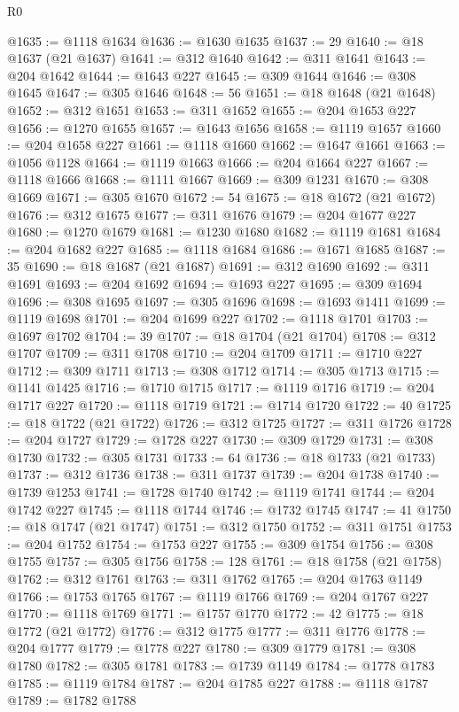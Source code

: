 \begin{lexlean}{R0}
\begin{coremodule}
@1635 := @1118 @1634
@1636 := @1630 @1635
@1637 := 29
@1640 := @18 @1637 (@21 @1637)
@1641 := @312 @1640
@1642 := @311 @1641
@1643 := @204 @1642
@1644 := @1643 @227
@1645 := @309 @1644
@1646 := @308 @1645
@1647 := @305 @1646
@1648 := 56
@1651 := @18 @1648 (@21 @1648)
@1652 := @312 @1651
@1653 := @311 @1652
@1655 := @204 @1653 @227
@1656 := @1270 @1655
@1657 := @1643 @1656
@1658 := @1119 @1657
@1660 := @204 @1658 @227
@1661 := @1118 @1660
@1662 := @1647 @1661
@1663 := @1056 @1128
@1664 := @1119 @1663
@1666 := @204 @1664 @227
@1667 := @1118 @1666
@1668 := @1111 @1667
@1669 := @309 @1231
@1670 := @308 @1669
@1671 := @305 @1670
@1672 := 54
@1675 := @18 @1672 (@21 @1672)
@1676 := @312 @1675
@1677 := @311 @1676
@1679 := @204 @1677 @227
@1680 := @1270 @1679
@1681 := @1230 @1680
@1682 := @1119 @1681
@1684 := @204 @1682 @227
@1685 := @1118 @1684
@1686 := @1671 @1685
@1687 := 35
@1690 := @18 @1687 (@21 @1687)
@1691 := @312 @1690
@1692 := @311 @1691
@1693 := @204 @1692
@1694 := @1693 @227
@1695 := @309 @1694
@1696 := @308 @1695
@1697 := @305 @1696
@1698 := @1693 @1411
@1699 := @1119 @1698
@1701 := @204 @1699 @227
@1702 := @1118 @1701
@1703 := @1697 @1702
@1704 := 39
@1707 := @18 @1704 (@21 @1704)
@1708 := @312 @1707
@1709 := @311 @1708
@1710 := @204 @1709
@1711 := @1710 @227
@1712 := @309 @1711
@1713 := @308 @1712
@1714 := @305 @1713
@1715 := @1141 @1425
@1716 := @1710 @1715
@1717 := @1119 @1716
@1719 := @204 @1717 @227
@1720 := @1118 @1719
@1721 := @1714 @1720
@1722 := 40
@1725 := @18 @1722 (@21 @1722)
@1726 := @312 @1725
@1727 := @311 @1726
@1728 := @204 @1727
@1729 := @1728 @227
@1730 := @309 @1729
@1731 := @308 @1730
@1732 := @305 @1731
@1733 := 64
@1736 := @18 @1733 (@21 @1733)
@1737 := @312 @1736
@1738 := @311 @1737
@1739 := @204 @1738
@1740 := @1739 @1253
@1741 := @1728 @1740
@1742 := @1119 @1741
@1744 := @204 @1742 @227
@1745 := @1118 @1744
@1746 := @1732 @1745
@1747 := 41
@1750 := @18 @1747 (@21 @1747)
@1751 := @312 @1750
@1752 := @311 @1751
@1753 := @204 @1752
@1754 := @1753 @227
@1755 := @309 @1754
@1756 := @308 @1755
@1757 := @305 @1756
@1758 := 128
@1761 := @18 @1758 (@21 @1758)
@1762 := @312 @1761
@1763 := @311 @1762
@1765 := @204 @1763 @1149
@1766 := @1753 @1765
@1767 := @1119 @1766
@1769 := @204 @1767 @227
@1770 := @1118 @1769
@1771 := @1757 @1770
@1772 := 42
@1775 := @18 @1772 (@21 @1772)
@1776 := @312 @1775
@1777 := @311 @1776
@1778 := @204 @1777
@1779 := @1778 @227
@1780 := @309 @1779
@1781 := @308 @1780
@1782 := @305 @1781
@1783 := @1739 @1149
@1784 := @1778 @1783
@1785 := @1119 @1784
@1787 := @204 @1785 @227
@1788 := @1118 @1787
@1789 := @1782 @1788

\end{coremodule}
\end{lexlean}

